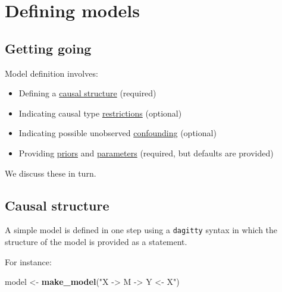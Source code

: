 \documentclass[
  12pt,
]{book}
\newenvironment{Shaded}{\begin{snugshade}}{\end{snugshade}}
\newcommand{\KeywordTok}[1]{\textcolor[rgb]{0.13,0.29,0.53}{\textbf{#1}}}
\newcommand{\NormalTok}[1]{#1}
\newcommand{\OperatorTok}[1]{\textcolor[rgb]{0.81,0.36,0.00}{\textbf{#1}}}
\newcommand{\StringTok}[1]{\textcolor[rgb]{0.31,0.60,0.02}{#1}}
\providecommand{\tightlist}{%
  \setlength{\itemsep}{0pt}\setlength{\parskip}{0pt}}
\begin{document}
\begin{Shaded}
\end{Shaded}

\hypertarget{defining-models}{%
\chapter{Defining models}\label{defining-models}}

\hypertarget{getting-going}{%
\section{Getting going}\label{getting-going}}

Model definition involves:

\begin{itemize}
\tightlist
\item
  Defining a \protect\hyperlink{structure}{causal structure} (required)
\item
  Indicating causal type \protect\hyperlink{restrictions}{restrictions} (optional)
\item
  Indicating possible unobserved \protect\hyperlink{confounding}{confounding} (optional)
\item
  Providing \protect\hyperlink{priors}{priors} and \protect\hyperlink{parameters}{parameters} (required, but defaults are provided)
\end{itemize}

We discuss these in turn.

\hypertarget{structure}{%
\section{Causal structure}\label{structure}}

A simple model is defined in one step using a \texttt{dagitty} syntax in which the structure of the model is provided as a statement.

For instance:

\begin{Shaded}
\begin{Highlighting}[]
\NormalTok{model <-}\StringTok{ }\KeywordTok{make_model}\NormalTok{(}\StringTok{"X -> M -> Y <- X"}\NormalTok{)}
\end{Highlighting}
\end{Shaded}
\end{document}
